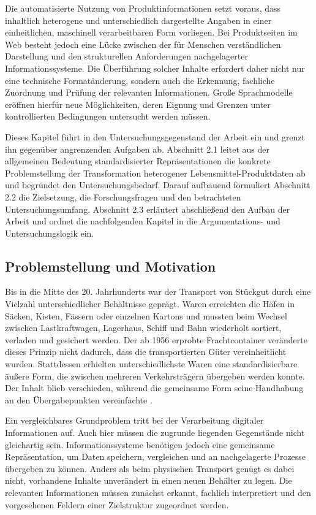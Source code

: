 Die automatisierte Nutzung von Produktinformationen setzt voraus, dass inhaltlich heterogene und unterschiedlich dargestellte Angaben in einer einheitlichen, maschinell verarbeitbaren Form vorliegen. Bei Produktseiten im Web besteht jedoch eine Lücke zwischen der für Menschen verständlichen Darstellung und den strukturellen Anforderungen nachgelagerter Informationssysteme. Die Überführung solcher Inhalte erfordert daher nicht nur eine technische Formatänderung, sondern auch die Erkennung, fachliche Zuordnung und Prüfung der relevanten Informationen. Große Sprachmodelle eröffnen hierfür neue Möglichkeiten, deren Eignung und Grenzen unter kontrollierten Bedingungen untersucht werden müssen.

Dieses Kapitel führt in den Untersuchungsgegenstand der Arbeit ein und grenzt ihn gegenüber angrenzenden Aufgaben ab. Abschnitt 2.1 leitet aus der allgemeinen Bedeutung standardisierter Repräsentationen die konkrete Problemstellung der Transformation heterogener Lebensmittel-Produktdaten ab und begründet den Untersuchungsbedarf. Darauf aufbauend formuliert Abschnitt 2.2 die Zielsetzung, die Forschungsfragen und den betrachteten Untersuchungsumfang. Abschnitt 2.3 erläutert abschließend den Aufbau der Arbeit und ordnet die nachfolgenden Kapitel in die Argumentations- und Untersuchungslogik ein.

\subsection{Problemstellung und Motivation}

Bis in die Mitte des 20. Jahrhunderts war der Transport von Stückgut durch eine Vielzahl unterschiedlicher Behältnisse geprägt. Waren erreichten die Häfen in Säcken, Kisten, Fässern oder einzelnen Kartons und mussten beim Wechsel zwischen Lastkraftwagen, Lagerhaus, Schiff und Bahn wiederholt sortiert, verladen und gesichert werden. Der ab 1956 erprobte Frachtcontainer veränderte dieses Prinzip nicht dadurch, dass die transportierten Güter vereinheitlicht wurden. Stattdessen erhielten unterschiedlichste Waren eine standardisierbare äußere Form, die zwischen mehreren Verkehrsträgern übergeben werden konnte. Der Inhalt blieb verschieden, während die gemeinsame Form seine Handhabung an den Übergabepunkten vereinfachte \cite{levinson2016box}.

Ein vergleichbares Grundproblem tritt bei der Verarbeitung digitaler Informationen auf. Auch hier müssen die zugrunde liegenden Gegenstände nicht gleichartig sein. Informationssysteme benötigen jedoch eine gemeinsame Repräsentation, um Daten speichern, vergleichen und an nachgelagerte Prozesse übergeben zu können. Anders als beim physischen Transport genügt es dabei nicht, vorhandene Inhalte unverändert in einen neuen Behälter zu legen. Die relevanten Informationen müssen zunächst erkannt, fachlich interpretiert und den vorgesehenen Feldern einer Zielstruktur zugeordnet werden.

